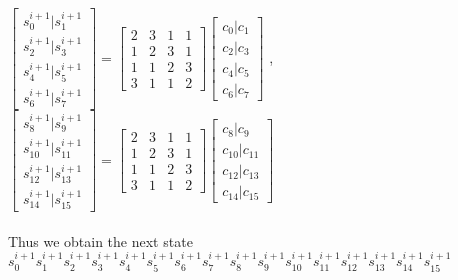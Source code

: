 \begin{frame}
	$\begin{bmatrix}
	s^{i+1}_{0} | s^{i+1}_{1}\\
	s^{i+1}_{2} | s^{i+1}_{3}\\
	s^{i+1}_{4} | s^{i+1}_{5}\\
	s^{i+1}_{6} | s^{i+1}_{7}
	\end{bmatrix}=
	\begin{bmatrix}
	2&3&1&1\\
	1&2&3&1\\
	1&1&2&3\\
	3&1&1&2
	\end{bmatrix}
	\begin{bmatrix}
	c_{0}|c_{1}\\
	c_{2}|c_{3}\\
	c_{4}|c_{5}\\
	c_{6}|c_{7}
	\end{bmatrix}  $ ,
	$\begin{bmatrix}
	s^{i+1}_{8} | s^{i+1}_{9}\\
	s^{i+1}_{10} | s^{i+1}_{11}\\
	s^{i+1}_{12} | s^{i+1}_{13}\\
	s^{i+1}_{14} | s^{i+1}_{15}
	\end{bmatrix}=
	\begin{bmatrix}
	2&3&1&1\\
	1&2&3&1\\
	1&1&2&3\\
	3&1&1&2
	\end{bmatrix}
	\begin{bmatrix}
	c_{8}|c_{9}\\
	c_{10}|c_{11}\\
	c_{12}|c_{13}\\
	c_{14}|c_{15}
	\end{bmatrix}  $\\ \\
	Thus we obtain the next state 
	$ s^{i+1}_{0}  s^{i+1}_{1}
	s^{i+1}_{2}  s^{i+1}_{3}
	s^{i+1}_{4}  s^{i+1}_{5}
	s^{i+1}_{6}  s^{i+1}_{7}
	s^{i+1}_{8}  s^{i+1}_{9}
	s^{i+1}_{10}  s^{i+1}_{11}
	s^{i+1}_{12}  s^{i+1}_{13}
	s^{i+1}_{14}  s^{i+1}_{15} $
\end{frame}
	
	
